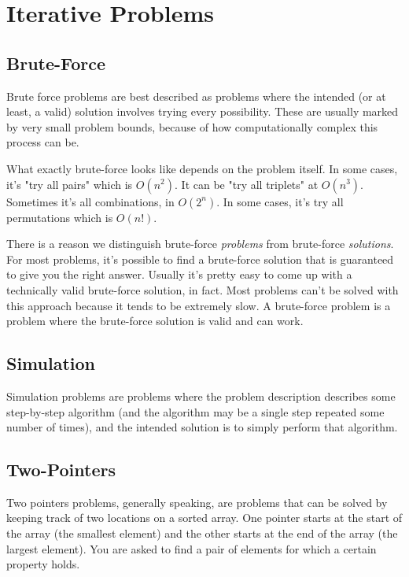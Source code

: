 \section{Iterative Problems}
\subsection{Brute-Force}

Brute force problems are best described as problems where the intended (or at least, a valid) solution involves trying every possibility. These are usually marked by very small problem bounds, because of how computationally complex this process can be.

What exactly brute-force looks like depends on the problem itself. In some cases, it's "try all pairs" which is $O(n^2)$. It can be "try all triplets" at $O(n^3)$. Sometimes it's all combinations, in $O(2^n)$. In some cases, it's try all permutations which is $O(n!)$.

There is a reason we distinguish brute-force \textit{problems} from brute-force \textit{solutions}. For most problems, it's possible to find a brute-force solution that is guaranteed to give you the right answer. Usually it's pretty easy to come up with a technically valid brute-force solution, in fact. Most problems can't be solved with this approach because it tends to be extremely slow. A brute-force problem is a problem where the brute-force solution is valid and can work.

\subsection{Simulation}

Simulation problems are problems where the problem description describes some step-by-step algorithm (and the algorithm may be a single step repeated some number of times), and the intended solution is to simply perform that algorithm.

\hrulefill



\hrulefill

\subsection{Two-Pointers}

Two pointers problems, generally speaking, are problems that can be solved by keeping track of two locations on a sorted array. One pointer starts at the start of the array (the smallest element) and the other starts at the end of the array (the largest element). You are asked to find a pair of elements for which a certain property holds.

